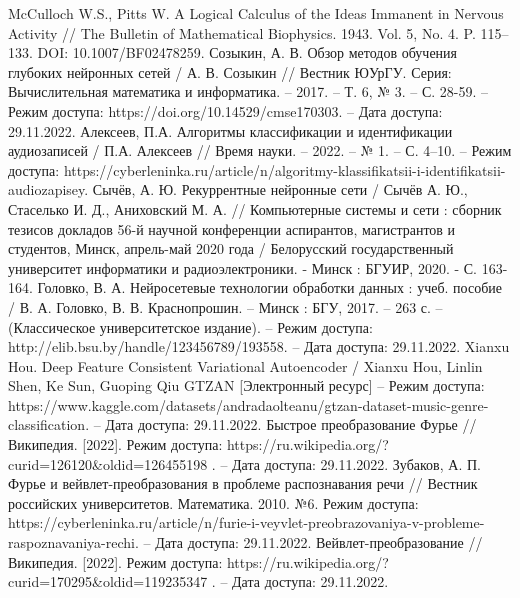 \begin{thebibliography}{99}
 McCulloch W.S., Pitts W. A Logical Calculus of the Ideas Immanent in Nervous Activity // The Bulletin of Mathematical Biophysics. 1943. Vol. 5, No. 4. P. 115–133.  DOI: 10.1007/BF02478259.
 Созыкин, А. В. Обзор методов обучения глубоких нейронных сетей / А. В. Созыкин // Вестник ЮУрГУ. Серия: Вычислительная математика и информатика. – 2017. – Т. 6, № 3. – С. 28-59. – Режим доступа: https://doi.org/10.14529/cmse170303. -- Дата доступа: 29.11.2022.
 Алексеев, П.А. Алгоритмы классификации и идентификации аудиозаписей / П.А. Алексеев // Время науки. – 2022. – № 1. – С. 4–10. – Режим доступа: https://cyberleninka.ru/article/n/algoritmy-klassifikatsii-i-identifikatsii-audiozapisey.
 Сычёв, А. Ю. Рекуррентные нейронные сети / Сычёв А. Ю., Стаселько И. Д., Аниховский М. А. // Компьютерные системы и сети : сборник тезисов докладов 56-й научной конференции аспирантов, магистрантов и студентов, Минск, апрель-май 2020 года / Белорусский государственный университет информатики и радиоэлектроники. - Минск : БГУИР, 2020. - С. 163-164.
 Головко, В. А. Нейросетевые технологии обработки данных : учеб. пособие / В. А. Головко, В. В. Краснопрошин. – Минск : БГУ, 2017. – 263 с. – (Классическое университетское издание). – Режим доступа: http://elib.bsu.by/handle/123456789/193558. -- Дата доступа: 29.11.2022.
 Xianxu Hou. Deep Feature Consistent Variational Autoencoder / Xianxu Hou, Linlin Shen, Ke Sun, Guoping Qiu
 GTZAN [Электронный ресурс] -- Режим доступа: https://www.kaggle.com/datasets/andradaolteanu/gtzan-dataset-music-genre-classification. -- Дата доступа: 29.11.2022.
 Быстрое преобразование Фурье // Википедия. [2022]. Режим доступа: https://ru.wikipedia.org/?curid=126120\&oldid=126455198 .  -- Дата доступа: 29.11.2022. 
 Зубаков, А. П. Фурье и вейвлет-преобразования в проблеме распознавания речи // Вестник российских университетов. Математика. 2010. №6. Режим доступа: https://cyberleninka.ru/article/n/furie-i-veyvlet-preobrazovaniya-v-probleme-raspoznavaniya-rechi.  -- Дата доступа: 29.11.2022.
 Вейвлет-преобразование // Википедия. [2022]. Режим доступа: https://ru.wikipedia.org/?curid=170295\&oldid=119235347 . -- Дата доступа: 29.11.2022.

\end{thebibliography}
